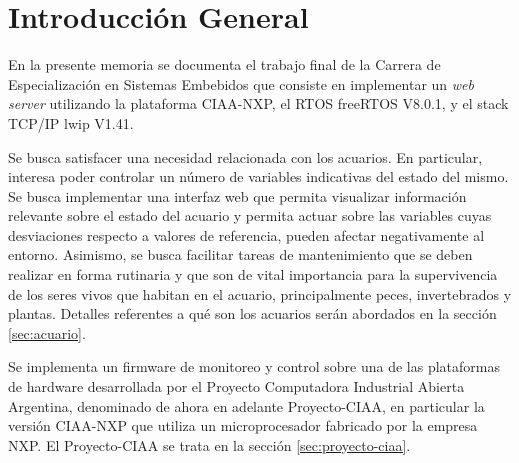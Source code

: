 
\chapter{Introducción General} %

\label{Chapter1} %
\label{IntroGeneral}


\newcommand{\keyword}[1]{\textbf{#1}}
\newcommand{\tabhead}[1]{\textbf{#1}}
\newcommand{\code}[1]{\texttt{#1}}
\newcommand{\file}[1]{\texttt{\bfseries#1}}
\newcommand{\option}[1]{\texttt{\itshape#1}}
\newcommand{\grados}{$^{\circ}$}



En la presente memoria se documenta el trabajo final de la Carrera de Especialización en Sistemas Embebidos que consiste en implementar un \textit{web server} utilizando la plataforma CIAA-NXP, el RTOS freeRTOS V8.0.1, y el stack TCP/IP lwip V1.41. 

Se busca satisfacer una necesidad relacionada con los acuarios. En particular, interesa poder controlar un número de variables indicativas del estado del mismo.  Se busca implementar una interfaz web que permita visualizar información relevante sobre el estado del acuario y permita actuar sobre las variables cuyas desviaciones respecto a valores de referencia, pueden afectar negativamente al entorno.  Asimismo, se busca facilitar tareas de mantenimiento que se deben realizar en forma rutinaria y que son de vital importancia para la supervivencia de los seres vivos que habitan en el acuario, principalmente peces, invertebrados y plantas. Detalles referentes a qué son los acuarios serán abordados en la sección \ref{sec:acuario}.

Se implementa un firmware de monitoreo y control sobre una de las plataformas de hardware desarrollada por el Proyecto Computadora Industrial Abierta Argentina, denominado de ahora en adelante Proyecto-CIAA, en particular la versión CIAA-NXP que utiliza un microprocesador fabricado por la empresa NXP. El Proyecto-CIAA se trata en la sección \ref{sec:proyecto-ciaa}.

